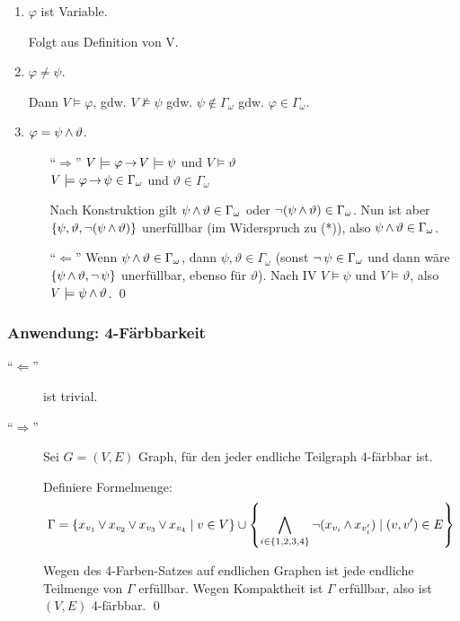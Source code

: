 \begin{enumerate}
  \item $\varphi$ ist Variable.\par
  Folgt aus Definition von V.
  
  \item $\varphi \not= \psi$.\par
  Dann $V\models\varphi$, gdw. $V\not\models\psi$ gdw. $\psi\not\in\Gamma_\omega$ gdw. $\varphi\in\Gamma_\omega$.
  
  \item $\varphi = \psi\operatorname{\wedge}\vartheta$.\par
  \begin{itemize}
    \item[\enquote{$\Rightarrow$}]
      $V\models\varphi \operatorname{\rightarrow} V\models\psi$ und $V\models\vartheta$\\
      $V\models\varphi \operatorname{\rightarrow} \psi\in\Gamma_\omega$ und $\vartheta\in\Gamma_\omega$
                                                    
    Nach Konstruktion gilt $\psi\operatorname{\wedge}\vartheta\in\Gamma_\omega$ oder
    $\operatorname{\neg}(\psi \operatorname{\wedge} \vartheta) \in \Gamma_\omega$. Nun ist aber
    $\left\{\psi, \vartheta, \operatorname{\neg}(\psi \operatorname{\wedge} \vartheta)\right\}$
    unerfüllbar (im Widerspruch zu (*)), also $\psi\operatorname{\wedge}\vartheta\in\Gamma_\omega$.
    
    \item[\enquote{$\Leftarrow$}]
    Wenn $\psi\operatorname{\wedge}\vartheta\in\Gamma_\omega$, dann $\psi,\vartheta\in\Gamma_\omega$
    (sonst $\operatorname{\neg}\psi\in\Gamma_\omega$ und dann wäre
    $\left\{\psi\operatorname{\wedge}\vartheta, \operatorname{\neg}\psi\right\}$ unerfüllbar, ebenso für $\vartheta$).
    Nach IV $V\models\psi$ und $V\models\vartheta$, also $V\models\psi\operatorname{\wedge}\vartheta$.
    \qed
  \end{itemize}
\end{enumerate}

\subsubsection{Anwendung: 4-Färbbarkeit}

\begin{description}
  \item[\enquote{$\Leftarrow$}] ist trivial.
  \item[\enquote{$\Rightarrow$}] Sei $G=(V,E)$ Graph, für den jeder endliche
  Teilgraph 4-färbbar ist.

  Definiere Formelmenge:
  \[
    \Gamma = \left\{x_{v_1} \operatorname{\vee} x_{v_2} \operatorname{\vee} x_{v_3} \operatorname{\vee} x_{v_4} \mid v \in V\right\}
      \cup \left\{\operatorname*{\bigwedge}_{i\in\left\{1,2,3,4\right\}} \operatorname{\neg} (x_{v_i} \operatorname{\wedge} x_{v_i'}) \mid (v,v')\in E \right\}
  \]

  Wegen des 4-Farben-Satzes auf endlichen Graphen ist jede endliche Teilmenge
  von $\Gamma$ erfüllbar. Wegen Kompaktheit ist $\Gamma$ erfüllbar, also ist
  $(V,E)$ 4-färbbar.
  \qed
\end{description}

